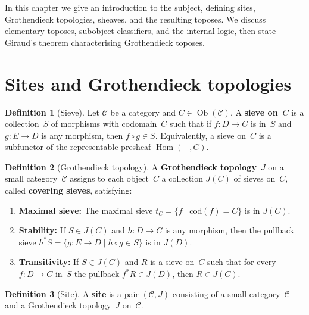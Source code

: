 \documentclass[a4paper,12pt]{book}
\DeclareMathOperator{\Hom}{Hom}
\DeclareMathOperator{\Ob}{Ob}
\theoremstyle{definition}
\newtheorem{definition}{Definition}[section]
\theoremstyle{plain}
\theoremstyle{remark}
\begin{document}
In this chapter we give an introduction to the subject, defining sites,
Grothendieck topologies, sheaves, and the resulting toposes.
We discuss elementary toposes, subobject classifiers, and the internal
logic, then state Giraud's theorem characterising Grothendieck toposes.


\section{Sites and Grothendieck topologies}\label{sec:sites}


\begin{definition}[Sieve]\label{def:sieve}
Let $\mathcal{C}$ be a category and $C\in\Ob(\mathcal{C})$.
A \textbf{sieve on~$C$} is a collection~$S$ of morphisms with
codomain~$C$ such that if $f\colon D\to C$ is in~$S$ and
$g\colon E\to D$ is any morphism, then $f\circ g\in S$.
Equivalently, a sieve on~$C$ is a subfunctor of the representable
presheaf $\Hom(-,C)$.
\end{definition}

\begin{definition}[Grothendieck topology]\label{def:grothendieck-topology}
A \textbf{Grothendieck topology}~$J$ on a small category~$\mathcal{C}$
assigns to each object~$C$ a collection $J(C)$ of sieves on~$C$, called
\textbf{covering sieves}, satisfying:
\begin{enumerate}[label=(\roman*)]
\item \textbf{Maximal sieve:} The maximal sieve
      $t_C = \{f \mid \mathrm{cod}(f) = C\}$ is in $J(C)$.
\item \textbf{Stability:} If $S\in J(C)$ and $h\colon D\to C$ is any
      morphism, then the pullback sieve
      $h^*S = \{g\colon E\to D \mid h\circ g\in S\}$ is in $J(D)$.
\item \textbf{Transitivity:} If $S\in J(C)$ and $R$ is a sieve on~$C$
      such that for every $f\colon D\to C$ in~$S$ the pullback
      $f^*R\in J(D)$, then $R\in J(C)$.
\end{enumerate}
\end{definition}

\begin{definition}[Site]\label{def:site}
A \textbf{site} is a pair $(\mathcal{C}, J)$ consisting of a small
category~$\mathcal{C}$ and a Grothendieck topology~$J$ on~$\mathcal{C}$.
\end{definition}
\end{document}
